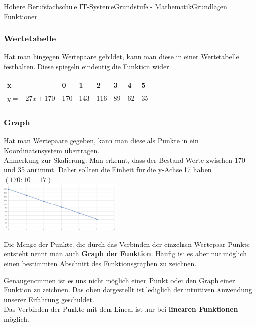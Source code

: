 \documentclass[11pt,twocolumn,oneside,openany,headings=optiontotoc,11pt,numbers=noenddot]{article}
\begin{document}
\begin{worksheet}{Höhere Berufsfachschule IT-Systeme}{Grundstufe - Mathematik}{Grundlagen Funktionen}
		\subsubsection*{Wertetabelle}
		Hat man hingegen Wertepaare gebildet, kann man diese in einer Wertetabelle festhalten. Diese spiegeln eindeutig die Funktion wider.\\
		\par\bigskip\noindent
		\begin{tabularx}{0.5\textwidth}{|X|l|l|l|l|l|l|}
			\hline
			x & 0 & 1 & 2 & 3 & 4 & 5\\
			\hline
			\(y = -27x + 170\) & 170 & 143 & 116 & 89 & 62 & 35\\
			\hline
		\end{tabularx}
		\subsubsection*{Graph}
		Hat man Wertepaare gegeben, kann man diese als Punkte in ein Koordinatensystem übertragen.\\
		\underline{Anmerkung zur Skalierung:} Man erkennt, dass der Bestand Werte zwischen 170 und 35 annimmt. Daher sollten die Einheit für die y-Achse 17 haben \((170:10 = 17)\)\\
		\includegraphics[width=0.45\textwidth]{../99_Bilder/bierkoord.jpg}\\
		\par\bigskip\noindent
		Die Menge der Punkte, die durch das Verbinden der einzelnen Wertepaar-Punkte entsteht nennt man auch \underline{\textbf{Graph der Funktion}}. Häufig ist es aber nur möglich einen bestimmten Abschnitt des \underline{Funktionsgraphen} zu zeichnen.\\
		\par\bigskip\noindent
		Genaugenommen ist es uns nicht möglich einen Punkt oder den Graph einer Funktion zu zeichnen. Das oben dargestellt ist lediglich der intuitiven Anwendung unserer Erfahrung geschuldet.\\
		Das Verbinden der Punkte mit dem Lineal ist nur bei \textbf{linearen Funktionen} möglich.\\
		\textit{\color{red}{Im Allgemeinen gilt: Das Verwenden des Lineals zum Verbinden der Punkte ist streng verboten!}}\\
		\par\bigskip\noindent

\end{worksheet}
\end{document}
